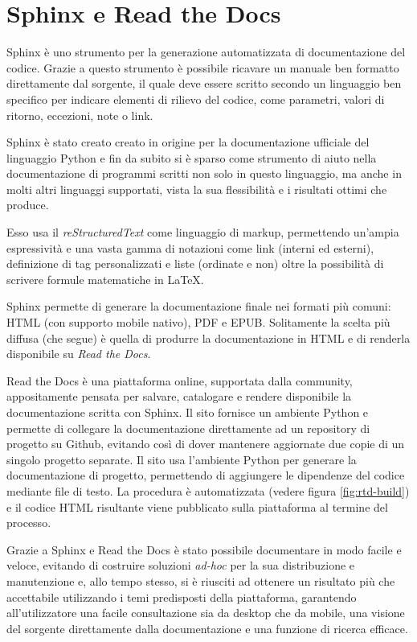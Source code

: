 
\section{Sphinx e Read the Docs}
\label{seq:sphinx-rtd}
Sphinx è uno strumento per la generazione automatizzata di documentazione
del codice. Grazie a questo strumento è possibile ricavare un manuale
ben formatto direttamente dal sorgente, il quale deve essere scritto
secondo un linguaggio ben specifico per indicare elementi di rilievo
del codice, come parametri, valori di ritorno, eccezioni,
note o link.

Sphinx è stato creato creato in origine per la documentazione ufficiale
del linguaggio Python\cite{python-doc} e fin da subito si è sparso
come strumento di aiuto nella documentazione di programmi scritti
non solo in questo linguaggio, ma anche in molti altri linguaggi supportati,
vista la sua flessibilità e i risultati ottimi che produce.

Esso usa il \emph{reStructuredText} come linguaggio di markup, permettendo
un'ampia espressività e una vasta gamma di notazioni come link (interni ed esterni),
definizione di tag personalizzati e liste (ordinate e non) oltre la possibilità
di scrivere formule matematiche in \LaTeX.

Sphinx permette di generare la documentazione finale nei formati più comuni:
HTML (con supporto mobile nativo), PDF e EPUB. Solitamente la scelta
più diffusa (che \pygfa segue) è quella di produrre la documentazione in
HTML e di renderla disponibile su \emph{Read the Docs}.

\label{seq:sphinx}
Read the Docs è una piattaforma online, supportata dalla community,
appositamente pensata per salvare, catalogare e rendere disponibile
la documentazione scritta con Sphinx.
Il sito fornisce un ambiente Python e permette di collegare la documentazione
direttamente ad un repository di progetto su Github, evitando così di
dover mantenere aggiornate due copie di un singolo progetto separate.
Il sito usa l'ambiente Python per generare la documentazione di
progetto, permettendo di aggiungere le dipendenze del codice mediante
file di testo. La procedura è automatizzata (vedere figura
\ref{fig:rtd-build}) e il codice HTML risultante viene pubblicato sulla
piattaforma al termine del processo.

Grazie a Sphinx e Read the Docs è stato possibile documentare \pygfa
in modo facile e veloce, evitando di costruire soluzioni \emph{ad-hoc}
per la sua distribuzione e manutenzione e, allo tempo stesso,
si è riusciti ad ottenere un risultato più che accettabile utilizzando
i temi predisposti della piattaforma, garantendo all'utilizzatore
una facile consultazione sia da desktop che da mobile, una visione
del sorgente direttamente dalla documentazione e una funzione
di ricerca efficace.

